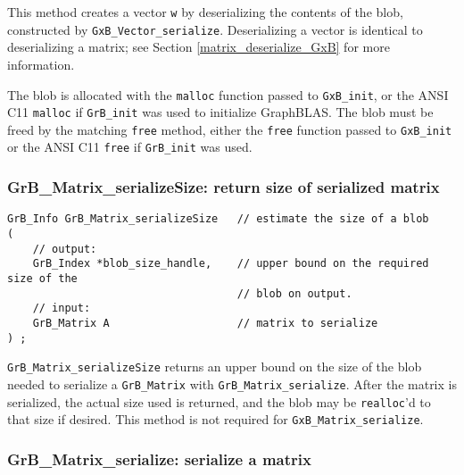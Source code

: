 \documentclass[12pt]{article}
\begin{document}
This method creates a vector \verb'w' by deserializing the contents of the
blob, constructed by
\verb'GxB_Vector_serialize'.
Deserializing a vector is identical to deserializing a matrix;
see Section \ref{matrix_deserialize_GxB} for more information.

The blob is allocated with the \verb'malloc' function passed to
\verb'GxB_init', or the ANSI C11 \verb'malloc' if \verb'GrB_init' was used
to initialize GraphBLAS.  The blob must be freed by the matching \verb'free'
method, either the \verb'free' function passed to \verb'GxB_init' or
the ANSI C11 \verb'free' if \verb'GrB_init' was used.


\subsubsection{{\sf GrB\_Matrix\_serializeSize:}  return size of serialized matrix}
\label{matrix_serialize_size}

\begin{mdframed}[userdefinedwidth=6in]
{\footnotesize
\begin{verbatim}
GrB_Info GrB_Matrix_serializeSize   // estimate the size of a blob
(
    // output:
    GrB_Index *blob_size_handle,    // upper bound on the required size of the
                                    // blob on output.
    // input:
    GrB_Matrix A                    // matrix to serialize
) ;
\end{verbatim}
} \end{mdframed}

\verb'GrB_Matrix_serializeSize' returns an upper bound on the size of the blob
needed to serialize a \verb'GrB_Matrix' with \verb'GrB_Matrix_serialize'.
After the matrix is serialized, the actual size used is returned, and the blob
may be \verb'realloc''d to that size if desired.
This method is not required for \verb'GxB_Matrix_serialize'.

\newpage
\subsubsection{{\sf GrB\_Matrix\_serialize:}      serialize a matrix}
\label{matrix_serialize}
\end{document}
